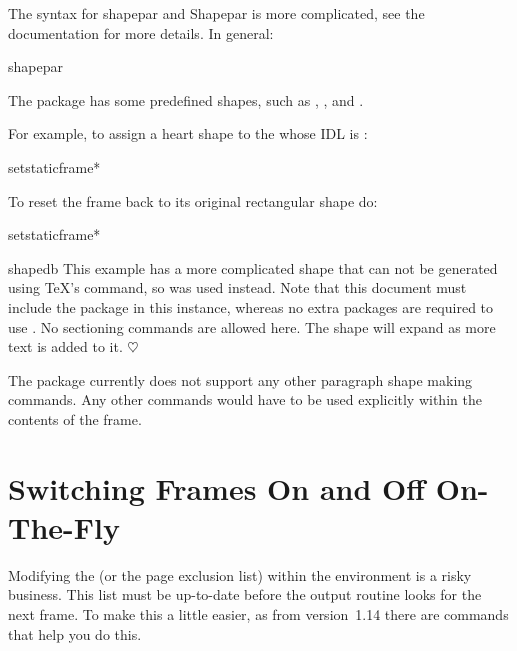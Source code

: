 \documentclass[fontsize=12pt]{scrbook}
\begin{document}
The syntax for \gls{shapepar} and \gls{Shapepar} is more complicated, see
the  documentation for more details. In general:
\begin{compactcodebox}
\gls{shapepar}
\end{compactcodebox}
The  package has some predefined shapes, such as
, , 
 and .

For example, to assign a heart shape to the  whose 
\gls*{IDL} is :
\begin{codebox}
\gls{setstaticframe}*
\end{codebox}
To reset the frame back to its original rectangular shape
do:
\begin{codebox}
\gls{setstaticframe}*
\end{codebox}

\begin{staticcontents*}
[html={show,image,name=heartshapedpar,alt={heart-shaped paragraph}}]
{shapedb}
This example has a more complicated shape that can not 
be generated using \TeX's  command, so
 was used instead. Note that this document
must include the  package in this instance,
whereas no extra packages are required to use .
No sectioning commands are allowed here.
The shape will expand as more text is added to it.
$\heartsuit$
\end{staticcontents*}

The  package currently does not support any other
paragraph shape making commands. Any other commands would
have to be used explicitly within the contents of the frame.


\section{Switching Frames On and Off On-The-Fly}
\label{sec:switch}

Modifying the  (or the page exclusion list) within the
 environment is a risky business. This list must
be up-to-date before the output routine looks for the next frame.
To make this a little easier, as from version~1.14 there are
commands that help you do this. 
\end{document}
